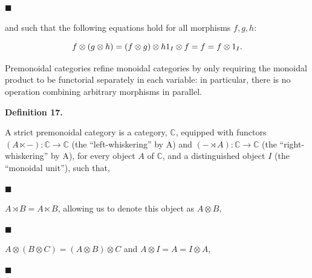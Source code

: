 
 
\par\noindent  $\blacksquare$ 
 
and such that the following equations hold for all morphisms $f,g,h$:\par
    \[f\otimes(g\otimes h)=(f\otimes g)\otimes h\\
1_{I}\otimes f=f=f\otimes 1_{I}.\]    
 
  
 
 
 
Premonoidal categories refine monoidal categories by only requiring the monoidal product to be functorial separately in each variable: in particular, there is no operation combining arbitrary morphisms in parallel.\par
 
 
 
\par\medskip\noindent\textbf{Definition 17.}\par
 
 
A strict premonoidal category is a category, $\mathbb{C}$, equipped with functors $(A\ltimes-):\mathbb{C}\to\mathbb{C}$ (the “left-whiskering” by A) and $(-\rtimes A):\mathbb{C}\to\mathbb{C}$ (the “right-whiskering” by A), for every object $A$ of $\mathbb{C}$, and a distinguished object $I$ (the “monoidal unit”), such that,\par
  
\par\noindent  $\blacksquare$ 
 
$A\rtimes B=A\ltimes B$, allowing us to denote this object as $A\otimes B$,\par
 
 
 
\par\noindent  $\blacksquare$ 
 
$A\otimes(B\otimes C)=(A\otimes B)\otimes C$ and $A\otimes I=A=I\otimes A$,\par
 
 
 
\par\noindent  $\blacksquare$ 
 

